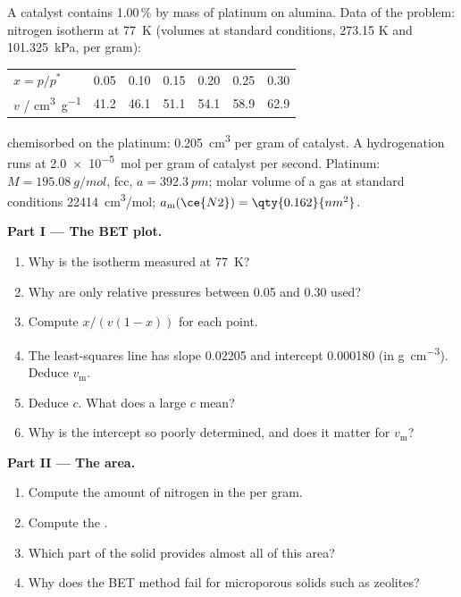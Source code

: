 \begin{problem}
\label{pb:b3:surfaces-catalysis:1}
A catalyst contains 1.00\,\% by mass of platinum on alumina. Data of the problem:
nitrogen isotherm at \qty{77}{K} (volumes at standard conditions, 273.15 K and
\qty{101.325}{kPa}, per gram):
\begin{center}\small
\begin{tabular}{lcccccc}
\hline
$x = p/p^*$ & 0.05 & 0.10 & 0.15 & 0.20 & 0.25 & 0.30 \\
$v$ / \unit{cm^3.g^{-1}} & 41.2 & 46.1 & 51.1 & 54.1 & 58.9 & 62.9 \\ \hline
\end{tabular}
\end{center}
 chemisorbed on the platinum: \qty{0.205}{cm^3} per gram of catalyst. A hydrogenation
runs at \qty{2.0e-5}{mol} per gram of catalyst per second. Platinum: $M = \qty{195.08}{g/mol}$, fcc,
$a = \qty{392.3}{pm}$; molar volume of a gas at standard conditions \qty{22414}{cm^3/mol};
$a_{\mathrm m}(\ce{N2}) = \qty{0.162}{nm^2}$.

\medskip\noindent\textbf{Part I --- The BET plot.}
\begin{enumerate}
  \item Why is the isotherm measured at \qty{77}{K}?
  \item Why are only relative pressures between 0.05 and 0.30 used?
  \item Compute $x/(v(1 - x))$ for each point.
  \item The least-squares line has slope \num{0.02205} and intercept \num{0.000180} (in
        \unit{g.cm^{-3}}). Deduce $v_{\mathrm m}$.
  \item Deduce $c$. What does a large $c$ mean?
  \item Why is the intercept so poorly determined, and does it matter for $v_{\mathrm m}$?
\end{enumerate}

\medskip\noindent\textbf{Part II --- The area.}
\begin{enumerate}[resume]
  \item Compute the amount of nitrogen in the  per gram.
  \item Compute the .
  \item Which part of the solid provides almost all of this area?
  \item Why does the BET method fail for microporous solids such as zeolites?
\end{enumerate}


\end{problem}
